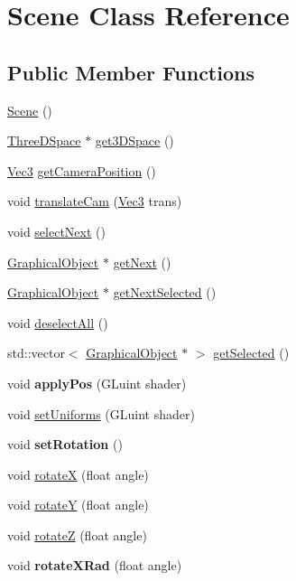 \hypertarget{classScene}{
\section{Scene Class Reference}
\label{classScene}
}
\subsection*{Public Member Functions}
\begin{DoxyCompactItemize}
\item 
\hyperlink{classScene_ad10176d75a9cc0da56626f682d083507}{Scene} ()
\item 
\hyperlink{classThreeDSpace}{ThreeDSpace} $\ast$ \hyperlink{classScene_ab74403c449c1431acab9c783331b2da0}{get3DSpace} ()
\item 
\hyperlink{structVec3}{Vec3} \hyperlink{classScene_a24db151a098841ac7e6e6bcf7205936d}{getCameraPosition} ()
\item 
void \hyperlink{classScene_aec4584d46e3c6b84167e2543f1a3debb}{translateCam} (\hyperlink{structVec3}{Vec3} trans)
\item 
void \hyperlink{classScene_acebcb8d63dbee5b93684697560ef9b87}{selectNext} ()
\item 
\hyperlink{classGraphicalObject}{GraphicalObject} $\ast$ \hyperlink{classScene_afd7622d2711b6bf5de1e0c10e4c7888e}{getNext} ()
\item 
\hyperlink{classGraphicalObject}{GraphicalObject} $\ast$ \hyperlink{classScene_a16ccb8a2a70b9f569e3200e102ffc50e}{getNextSelected} ()
\item 
void \hyperlink{classScene_afc4e124efa0700e2fc2108896b90fd04}{deselectAll} ()
\item 
std::vector$<$ \hyperlink{classGraphicalObject}{GraphicalObject} $\ast$ $>$ \hyperlink{classScene_ae3dc001c52db9e46815991c1584e6c56}{getSelected} ()
\item 
\hypertarget{classScene_ae1bf59ba2fe9e6a6ddd62a1b9acf54e3}{
void {\bfseries applyPos} (GLuint shader)}
\label{classScene_ae1bf59ba2fe9e6a6ddd62a1b9acf54e3}

\item 
void \hyperlink{classScene_adde244975633cbf7150b402fb943682a}{setUniforms} (GLuint shader)
\item 
\hypertarget{classScene_a80d8d660eb485e41aa0ad0ac5e130e64}{
void {\bfseries setRotation} ()}
\label{classScene_a80d8d660eb485e41aa0ad0ac5e130e64}

\item 
void \hyperlink{classScene_aadba0549da987fa2a34d928dc132f759}{rotateX} (float angle)
\item 
void \hyperlink{classScene_a371818ec48a73b3d26bf68b73652d7c1}{rotateY} (float angle)
\item 
void \hyperlink{classScene_a76932b0837c578d05de254dfe0304d6e}{rotateZ} (float angle)
\item 
\hypertarget{classScene_a52947077b36d09d8fb01f199473ba323}{
void {\bfseries rotateXRad} (float angle)}
\label{classScene_a52947077b36d09d8fb01f199473ba323}


\end{DoxyCompactItemize}
